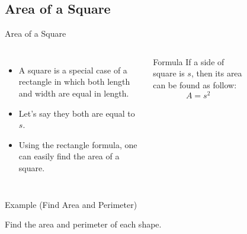 \subsection{Area of a Square}
\begin{frame}[t]{Area of a Square}
    \begin{columns}
    \begin{itemize}
        \item A square is a special case of a rectangle in which both length and width are equal in length.
        \item Let's say they both are equal to $s$.
        \item Using the rectangle formula, one can easily find the area of a square.
    \end{itemize}
    \begin{block}{Formula}
        If a side of square is $s$, then its area can be found as follow:
        \[ A = s^2\]
    \end{block}
    \begin{figure}[H]
        \centering
        
    \end{figure}    
    \end{columns}
\end{frame}
\begin{frame}[t]{Example (Find Area and Perimeter)}
    \begin{example}
        Find the area and perimeter of each shape.
        \begin{figure}[H]
            \centering
            
        \end{figure}
    \end{example}
\end{frame}

